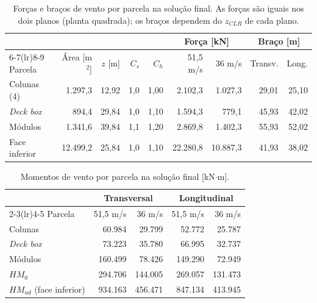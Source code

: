\documentclass[11pt,a4paper]{article}
\begin{document}
\begin{table}[!htb]
\centering
\caption[Forças e braços de vento na solução final]{Forças e braços de vento por parcela na solução
final. As forças são iguais nos dois planos (planta quadrada); os braços dependem do $z_{CLR}$ de
cada plano.}\label{tab:ventofinal}
\small\setlength{\tabcolsep}{4.5pt}
\begin{tabular}{lrrrrrrrr}
\toprule
 & & & & & \multicolumn{2}{c}{Força [kN]} & \multicolumn{2}{c}{Braço [m]} \\
\cmidrule(lr){6-7}\cmidrule(lr){8-9}
Parcela & Área [m$^2$] & $z$ [m] & $C_s$ & $C_h$ & 51,5 m/s & 36 m/s & Transv. & Long. \\
\midrule
Colunas (4) & 1.297,3 & 12,92 & 1,0 & 1,00 & 2.102,3 & 1.027,3 & 29,01 & 25,10 \\
\emph{Deck box} & 894,4 & 29,84 & 1,0 & 1,10 & 1.594,3 & 779,1 & 45,93 & 42,02 \\
Módulos & 1.341,6 & 39,84 & 1,1 & 1,20 & 2.869,8 & 1.402,3 & 55,93 & 52,02 \\
Face inferior & 12.499,2 & 25,84 & 1,0 & 1,10 & 22.280,8 & 10.887,3 & 41,93 & 38,02 \\
\bottomrule
\end{tabular}
\end{table}

\begin{table}[!htb]
\centering
\caption{Momentos de vento por parcela na solução final [kN$\cdot$m].}\label{tab:momentos}
\small
\begin{tabular}{lrrrr}
\toprule
 & \multicolumn{2}{c}{Transversal} & \multicolumn{2}{c}{Longitudinal} \\
\cmidrule(lr){2-3}\cmidrule(lr){4-5}
Parcela & 51,5 m/s & 36 m/s & 51,5 m/s & 36 m/s \\
\midrule
Colunas & 60.984 & 29.799 & 52.772 & 25.787 \\
\emph{Deck box} & 73.223 & 35.780 & 66.995 & 32.737 \\
Módulos & 160.499 & 78.426 & 149.290 & 72.949 \\
\midrule
$HM_0$ & 294.706 & 144.005 & 269.057 & 131.473 \\
$HM_{ud}$ (face inferior) & 934.163 & 456.471 & 847.134 & 413.945 \\
\bottomrule
\end{tabular}
\end{table}
\end{document}
